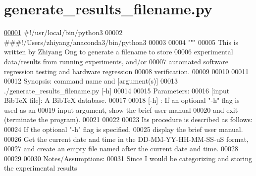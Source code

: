 \hypertarget{generate__results__filename_8py_source}{}\section{generate\+\_\+results\+\_\+filename.\+py}
\label{generate__results__filename_8py_source}

\begin{DoxyCode}
\hypertarget{generate__results__filename_8py_source_l00001}{}\hyperlink{namespaceutilities_1_1generate__results__filename}{00001} \textcolor{comment}{#!/usr/local/bin/python3}
00002 \textcolor{comment}{###!/Users/zhiyang/anaconda3/bin/python3}
00003 
00004 \textcolor{stringliteral}{"""}
00005 \textcolor{stringliteral}{    This is written by Zhiyang Ong to generate a filename to store}
00006 \textcolor{stringliteral}{        experimental data/results from running experiments, and/or}
00007 \textcolor{stringliteral}{        automated software regression testing and hardware regression}
00008 \textcolor{stringliteral}{        verification.}
00009 \textcolor{stringliteral}{}
00010 \textcolor{stringliteral}{}
00011 \textcolor{stringliteral}{}
00012 \textcolor{stringliteral}{    Synopsis: command name and [argument(s)]}
00013 \textcolor{stringliteral}{    ./generate\_results\_filename.py [-h]}
00014 \textcolor{stringliteral}{}
00015 \textcolor{stringliteral}{    Parameters:}
00016 \textcolor{stringliteral}{    [input BibTeX file]:    A BibTeX database.}
00017 \textcolor{stringliteral}{}
00018 \textcolor{stringliteral}{    [-h]                :   If an optional "-h" flag is used as an}
00019 \textcolor{stringliteral}{                            input argument, show the brief user manual}
00020 \textcolor{stringliteral}{                            and exit (terminate the program).}
00021 \textcolor{stringliteral}{}
00022 \textcolor{stringliteral}{}
00023 \textcolor{stringliteral}{    Its procedure is described as follows:}
00024 \textcolor{stringliteral}{    If the optional "-h" flag is specified,}
00025 \textcolor{stringliteral}{        display the brief user manual.}
00026 \textcolor{stringliteral}{    Get the current date and time in the DD-MM-YY-HH-MM-SS-uS format,}
00027 \textcolor{stringliteral}{        and create an empty file named after the current date and time.}
00028 \textcolor{stringliteral}{}
00029 \textcolor{stringliteral}{}
00030 \textcolor{stringliteral}{    Notes/Assumptions:}
00031 \textcolor{stringliteral}{    Since I would be categorizing and storing the experimental results}

\end{DoxyCode}
